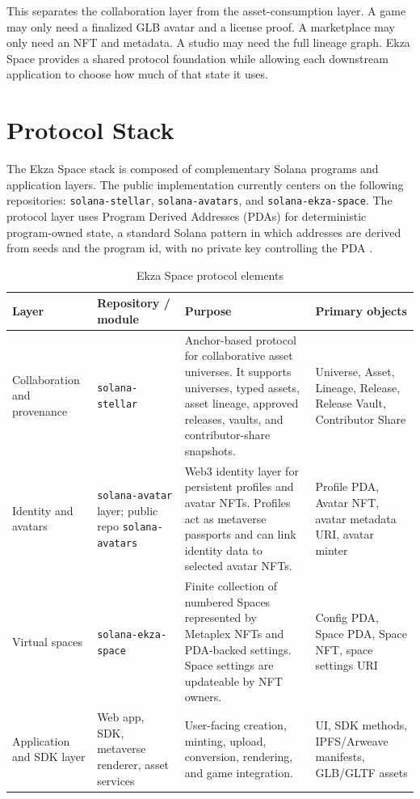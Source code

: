 \documentclass[10pt,twocolumn]{article}
\newcommand{\protocol}[1]{\texttt{#1}}
\begin{document}
This separates the collaboration layer from the asset-consumption layer. A game may only need a finalized GLB avatar and a license proof. A marketplace may only need an NFT and metadata. A studio may need the full lineage graph. Ekza Space provides a shared protocol foundation while allowing each downstream application to choose how much of that state it uses.

\section{Protocol Stack}
The Ekza Space stack is composed of complementary Solana programs and application layers. The public implementation currently centers on the following repositories: \protocol{solana-stellar}, \protocol{solana-avatars}, and \protocol{solana-ekza-space}. The protocol layer uses Program Derived Addresses (PDAs) for deterministic program-owned state, a standard Solana pattern in which addresses are derived from seeds and the program id, with no private key controlling the PDA \cite{solana_pda}.

\begin{table}[t]
\centering
\small
\caption{Ekza Space protocol elements}
\begin{tabularx}{\textwidth}{>{\raggedright\arraybackslash}p{} >{\raggedright\arraybackslash}p{} >{\raggedright\arraybackslash}X >{\raggedright\arraybackslash}p{}}
\toprule
\textbf{Layer} & \textbf{Repository / module} & \textbf{Purpose} & \textbf{Primary objects} \\
\midrule
Collaboration and provenance & \protocol{solana-stellar} & Anchor-based protocol for collaborative asset universes. It supports universes, typed assets, asset lineage, approved releases, vaults, and contributor-share snapshots. & Universe, Asset, Lineage, Release, Release Vault, Contributor Share \\
\addlinespace
Identity and avatars & \protocol{solana-avatar} layer; public repo \protocol{solana-avatars} & Web3 identity layer for persistent profiles and avatar NFTs. Profiles act as metaverse passports and can link identity data to selected avatar NFTs. & Profile PDA, Avatar NFT, avatar metadata URI, avatar minter \\
\addlinespace
Virtual spaces & \protocol{solana-ekza-space} & Finite collection of numbered Spaces represented by Metaplex NFTs and PDA-backed settings. Space settings are updateable by NFT owners. & Config PDA, Space PDA, Space NFT, space settings URI \\
\addlinespace
Application and SDK layer & Web app, SDK, metaverse renderer, asset services & User-facing creation, minting, upload, conversion, rendering, and game integration. & UI, SDK methods, IPFS/Arweave manifests, GLB/GLTF assets \\
\bottomrule
\end{tabularx}
\end{table}
\end{document}
